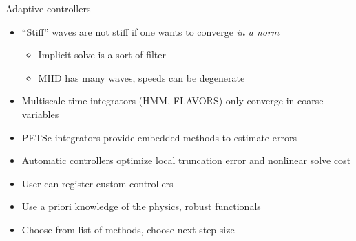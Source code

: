 \documentclass{beamer}
\begin{document}
\begin{frame}{Adaptive controllers}
  \begin{itemize}
  \item ``Stiff'' waves are not stiff if one wants to converge \emph{in a norm}
    \begin{itemize}
    \item Implicit solve is a sort of filter
    \item MHD has many waves, speeds can be degenerate
    \end{itemize}
  \item Multiscale time integrators (HMM, FLAVORS) only converge in coarse variables
  \item PETSc integrators provide embedded methods to estimate errors
  \item Automatic controllers optimize local truncation error and nonlinear solve cost
  \item User can register custom controllers
  \item Use a priori knowledge of the physics, robust functionals
  \item Choose from list of methods, choose next step size
  \end{itemize}
\end{frame}
\end{document}
